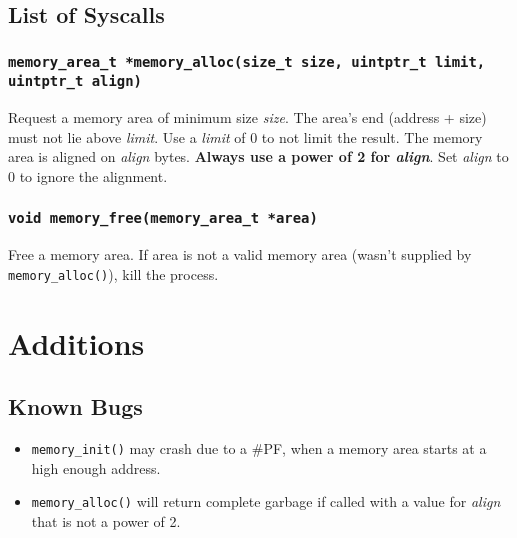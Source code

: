 \documentclass[a4paper,openany]{scrbook}
\begin{document}
\chapter{List of Syscalls}
\section{\texttt{memory\_area\_t *memory\_alloc(size\_t size, uintptr\_t limit, uintptr\_t align)}}
Request a memory area of minimum size \emph{size}. The area's end (address
+ size) must not lie above \emph{limit}. Use a \emph{limit} of 0 to not limit
the result. The memory area is aligned on \emph{align} bytes. \textbf{Always
use a power of 2 for \emph{align}}. Set \emph{align} to 0 to ignore the
alignment.
\section{\texttt{void memory\_free(memory\_area\_t *area)}}
Free a memory area. If area is not a valid memory area (wasn't supplied by
\texttt{memory\_alloc()}), kill the process.
\part{Additions}
\chapter{Known Bugs}
\begin{itemize}
\item \texttt{memory\_init()} may crash due to a \#PF, when a memory area starts at a high enough address.
\item \texttt{memory\_alloc()} will return complete garbage if called with a
value for \emph{align} that is not a power of 2.
\end{itemize}
\end{document}
